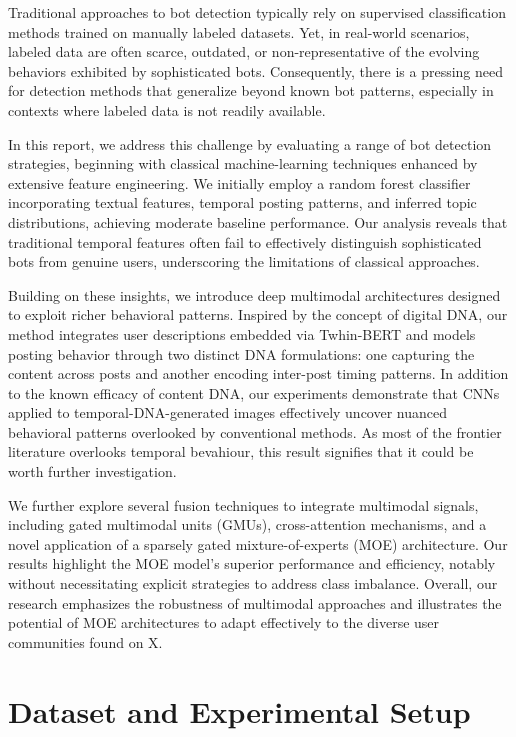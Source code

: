 \documentclass[conference]{IEEEtran}
\begin{document}
Traditional approaches to bot detection typically rely on supervised classification methods trained on manually labeled datasets. Yet, in real-world scenarios, labeled data are often scarce, outdated, or non-representative of the evolving behaviors exhibited by sophisticated bots. Consequently, there is a pressing need for detection methods that generalize beyond known bot patterns, especially in contexts where labeled data is not readily available.

In this report, we address this challenge by evaluating a range of bot detection strategies, beginning with classical machine-learning techniques enhanced by extensive feature engineering. We initially employ a random forest classifier incorporating textual features, temporal posting patterns, and inferred topic distributions, achieving moderate baseline performance. Our analysis reveals that traditional temporal features often fail to effectively distinguish sophisticated bots from genuine users, underscoring the limitations of classical approaches.

Building on these insights, we introduce deep multimodal architectures designed to exploit richer behavioral patterns. Inspired by the concept of digital DNA, our method integrates user descriptions embedded via Twhin-BERT and models posting behavior through two distinct DNA formulations: one capturing the content across posts and another encoding inter-post timing patterns. 
In addition to the known efficacy of content DNA, our experiments demonstrate that CNNs applied to temporal-DNA-generated images effectively uncover nuanced behavioral patterns overlooked by conventional methods. As most of the frontier literature 
overlooks temporal bevahiour, this result signifies that it could be worth further investigation.

We further explore several fusion techniques to integrate multimodal signals, including gated multimodal units (GMUs), cross-attention mechanisms, and a novel application of a sparsely gated mixture-of-experts (MOE) architecture. 
Our results highlight the MOE model's superior performance and efficiency, notably without necessitating explicit strategies to address class imbalance. Overall, our research emphasizes the 
robustness of multimodal approaches and illustrates the potential of MOE architectures to adapt effectively to the diverse user communities found on X.


\section{Dataset and Experimental Setup}
\end{document}
